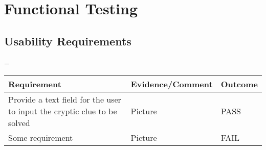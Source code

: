 \section{Functional Testing}
\label{sec:functional_testing}

\subsection{Usability Requirements}
\label{sub:test_func_usability}

\begin{landscape}
  \centering
  \setlength\LTleft{0pt}            %
  \setlength\LTright{0pt}           %
  \LTcapwidth=\textwidth
  \begin{longtable}{|L{10cm}|L{10cm}|C{2cm}|}
    \hline
    {\bfseries Requirement} & {\bfseries Evidence/Comment} & {\bfseries Outcome} \\
    \hline
    Provide a text field for the user to input the cryptic clue to be solved
    & Picture   & PASS \\ \hline
    Some requirement
    & Picture & FAIL \\ \hline
  \end{longtable}
\end{landscape}